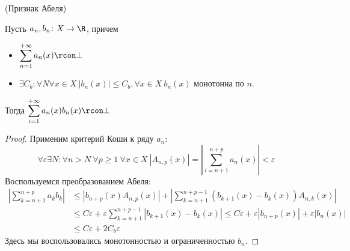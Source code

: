\begin{theorem}(Признак Абеля)

    Пусть $a_n, b_n \colon X \to \R$, причем
\begin{itemize}
    \item $\displaystyle \sum_{n = 1}^{+\infty}{a_n(x)} \rcon \bot$
    \item $\exists C_b\colon \forall N \forall x \in X~ |b_n(x)| \leqslant C_b,
    \forall x \in X~ b_n(x)$ монотонна по $n$.
\end{itemize}
    Тогда
    $\displaystyle \sum_{i = 1}^{+\infty}{a_n(x) b_n(x)} \rcon \bot$
\end{theorem}
\begin{proof}
    Применим критерий Коши к ряду $a_n$:
\[
    \forall \varepsilon \exists N\colon \forall n > N~ \forall p \geqslant
    1~ \forall x \in X~ |A_{n, p}(x)| = \left|\sum_{i = n + 1}^{n +
    p}{a_n(x)}\right| < \varepsilon
\]
    Воспользуемся преобразованием Абеля:
\begin{align*}
    \left|\sum_{k = n + 1}^{n + p}{a_k b_k}\right| &\leqslant |b_{n + p}(x)A_{n,
    p}(x)| + \left| \sum_{k = n + 1}^{n + p - 1}{(b_{k + 1}(x) - b_k(x))A_{n,
    k}(x)} \right| \\
    &\leqslant C \varepsilon + \varepsilon \sum_{k = n + 1}^{n + p - 1}{|b_{k +
    1}(x) - b_k(x)|} \leqslant C \varepsilon + \varepsilon|b_{n + p}(x)| +
    \varepsilon|b_n(x)| \\ &\leqslant C \varepsilon + 2C_b \varepsilon
\end{align*}
    Здесь мы воспользовались монотонностью и ограниченностью $b_n$.
\end{proof}
